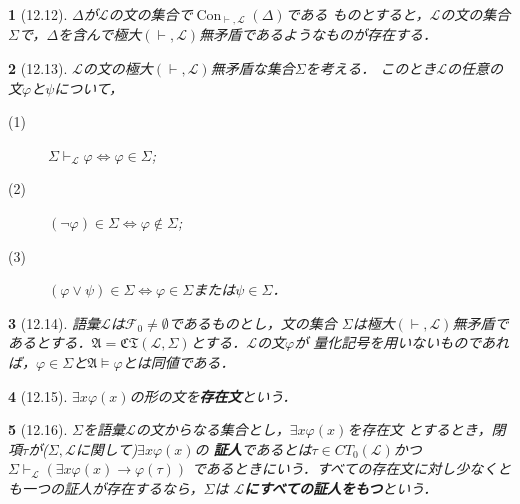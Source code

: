 \documentclass[a4j,10.5pt,oneside,openany]{jsbook}
\theoremstyle{mystyle}
\newtheorem{thm}{\color{DarkMidnightBlue}{定理}}[section]
\newtheorem{dfn}[thm]{\color{PakistanGreen}{定義}}
\newcommand{\Con}{\operatorname{Con}} %
\begin{document}
	\begin{screen}
		\begin{thm}[12.12]
			$\Delta$が$\mathcal{L}$の文の集合で$\Con_{\vdash,\mathcal{L}}(\Delta)$である
			ものとすると，$\mathcal{L}$の文の集合$\Sigma$で，$\Delta$を含んで極大$(\vdash,
			\mathcal{L})$無矛盾であるようなものが存在する．
		\end{thm}
	\end{screen}
	
	\begin{screen}
		\begin{thm}[12.13]
			$\mathcal{L}$の文の極大$(\vdash,\mathcal{L})$無矛盾な集合$\Sigma$を考える．
			このとき$\mathcal{L}$の任意の文$\varphi$と$\psi$について，
			\begin{description}
				\item[(1)] $\Sigma \vdash_{\mathcal{L}} \varphi
					\Longleftrightarrow \varphi \in \Sigma$;
				
				\item[(2)] $(\neg \varphi) \in \Sigma \Longleftrightarrow
					\varphi \notin \Sigma$;
				
				\item[(3)] $(\varphi \vee \psi) \in \Sigma \Longleftrightarrow
					\varphi \in \Sigma$または$\psi \in \Sigma$．
			\end{description}
		\end{thm}
	\end{screen}
	
	\begin{screen}
		\begin{thm}[12.14]
			語彙$\mathcal{L}$は$\mathcal{F}_{0} \neq \emptyset$であるものとし，文の集合
			$\Sigma$は極大$(\vdash,\mathcal{L})$無矛盾であるとする．$\mathfrak{A} = 
			\mathfrak{CT}(\mathcal{L},\Sigma)$とする．$\mathcal{L}$の文$\varphi$が
			量化記号を用いないものであれば，$\varphi \in \Sigma$と$\mathfrak{A} \models
			\varphi$とは同値である．
		\end{thm}
	\end{screen}
	
	\begin{screen}
		\begin{dfn}[12.15]
			$\exists x \varphi(x)$の形の文を{\bf 存在文}という．
		\end{dfn}
	\end{screen}
	
	\begin{screen}
		\begin{dfn}[12.16]
			$\Sigma$を語彙$\mathcal{L}$の文からなる集合とし，$\exists x \varphi(x)$を存在文
			とするとき，閉項$\tau$が($\Sigma,\mathcal{L}$に関して)$\exists x \varphi(x)$の
			{\bf 証人}であるとは$\tau \in CT_{0}(\mathcal{L})$かつ$\Sigma
			\vdash_{\mathcal{L}} \left(\exists x \varphi(x) \rightarrow \varphi(\tau)\right)$
			であるときにいう．すべての存在文に対し少なくとも一つの証人が存在するなら，$\Sigma$は
			{\bf $\mathcal{L}$にすべての証人をもつ}という．
		\end{dfn}
	\end{screen}
	
\end{document}

